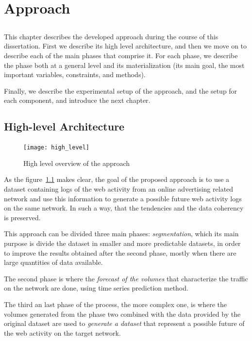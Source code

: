 \chapter{Approach}\label{chap:chap4}

\section*{}

This chapter describes the developed approach during the course of this
dissertation. First we describe its high level architecture, and then we move on
to describe each of the main phases that comprise it. For each phase, we
describe the phase both at a general level and its materialization (its main
goal, the most important variables, constraints, and methods). 

Finally, we describe the experimental setup of the approach, and the setup for
each component, and introduce the next chapter.

\section{High-level Architecture}

\begin{figure}[h] \begin{center} \leavevmode
\texttt{[image: high\_level]} \caption{ High level overview
of the approach } \label{fig:highlevel_arch} \end{center} \end{figure}

As the figure~\ref{fig:highlevel_arch} makes clear, the goal of the
proposed approach is to use a dataset containing logs of the web
activity from an online advertising related network and use this information 
to generate a possible future web activity logs on the same network. In such a way, that the
tendencies and the data coherency is preserved.

This approach can be divided three main phases: \emph{segmentation},
which its main purpose is divide the dataset in smaller and more predictable
datasets, in order to improve the results obtained after the second phase, mostly when there
are large quantities of data available.

The second phase is where the \emph{forecast of the volumes} that characterize the traffic on
the network are done, using time series prediction method.

The third an last phase of the process, the more complex one, is where the volumes
generated from the phase two combined with the data provided by the original
dataset are used to \emph{generate a dataset} that represent a possible future of the
web activity on the target network.

